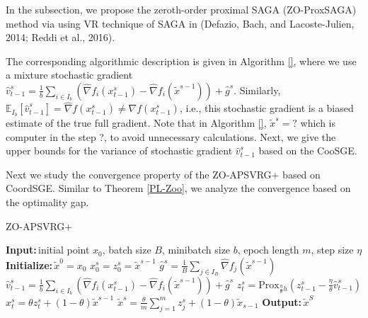 \documentclass{article}
\newcommand*{\Po}{\text{Prox}}
\newcommand*{\E}{\mathbb{E}}
\newcommand{\Initialize}{\textbf{Initialize:}{\,}}
\newcommand{\Input}{\textbf{Input:}{\,}}
\newcommand{\Output}{\textbf{Output:}{\,}}
\theoremstyle{definition}
\theoremstyle{remark}
\begin{document}
{\color{Green}

In the subsection, we propose the zeroth-order proximal SAGA (ZO-ProxSAGA) method via using VR technique of SAGA in (Defazio, Bach, and Lacoste-Julien, 2014; Reddi et al., 2016).

The corresponding algorithmic description is given in Algorithm \ref{}, where we use a mixture
stochastic gradient ${\hat{v}}_{t-1}^s = \frac{1}{b} \sum_{i\in I_b}\left(\hat{\nabla} f_{i}(x_{t-1}^s)-\hat{\nabla} f_{i}(\tilde{x}^{s-1})\right)+\hat{g}^s$. Similarly, $\E_{I_b}[\hat{v}_{t-1}^s] = \hat{\nabla} f(x_{t-1}^s) \neq {\nabla} f(x_{t-1}^s)$, i.e., this stochastic gradient is a biased
estimate of the true full gradient. Note that in Algorithm \ref{}, $\widetilde{x}^s = ?$ which is computer in the step ?, to avoid unnecessary calculations. Next, we give the upper bounds for the variance of stochastic gradient $\hat{v}_{t-1}^s$ based on the CooSGE.
}



{\color{Green}
Next we study the convergence property of the ZO-APSVRG+ based on CoordSGE.
}
Similar to
Theorem \ref{PL-Zoo}, we analyze the convergence based on the optimality gap.
\begin{algorithm}\label{APGconvex-Algo}
\caption{ZO-APSVRG+}\begin{algorithmic}[1]
\State\Input initial point $x_0$, batch size $B$, minibatch size $b$, epoch length $m$, step size $\eta$
\State\Initialize $\tilde{x}^0 = x_0$
\State $x_0^s = z_0^s = \widetilde{x}^{s-1}$
\State $\hat{g}^s = \frac{1}{B} \sum_{j\in I_B} \hat{\nabla} f_j (\tilde{x}^{s-1})$
\State $\hat{v}_{t-1}^s = \frac{1}{b} \sum_{i\in I_b}\left(\hat{\nabla} f_{i}(x_{t-1}^s)-\hat{\nabla} f_{i}(\tilde{x}^{s-1})\right)+\hat{g}^s$
\State $z_{t}^s= \Po_{\frac{\eta}{\theta} h}(z_{t-1}^s - \frac{\eta}{\theta} \hat{v}_{t-1}^s)$
\State $x_{t}^s = \theta z_{t}^s+(1-\theta)\widetilde{x}^{s-1}$
\EndFor
\State $\tilde{x}^s=\frac{\theta}{m}\sum_{j=1}^{m}z_j^s + (1-\theta)\tilde{x}_{s-1}$ 
 \EndFor
 \State\Output ${\tilde{x}}^{S}$
\end{algorithmic}
\end{algorithm}
\end{document}
